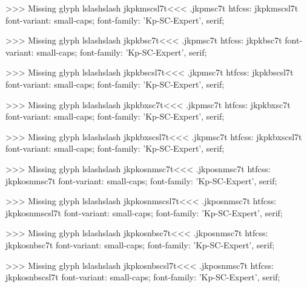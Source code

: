 >>>
Missing glyph	lslashslash
\<jkpkmscsl7t\><<<
.jkpmsc7t
htfcss:  jkpkmscsl7t  font-variant: small-caps; font-family: 'Kp-SC-Expert', serif;

>>>
Missing glyph	lslashslash
\<jkpkbsc7t\><<<
.jkpmsc7t
htfcss:  jkpkbsc7t  font-variant: small-caps; font-family: 'Kp-SC-Expert', serif;

>>>
Missing glyph	lslashslash
\<jkpkbscsl7t\><<<
.jkpmsc7t
htfcss:  jkpkbscsl7t  font-variant: small-caps; font-family: 'Kp-SC-Expert', serif;

>>>
Missing glyph	lslashslash
\<jkpkbxsc7t\><<<
.jkpmsc7t
htfcss:  jkpkbxsc7t  font-variant: small-caps; font-family: 'Kp-SC-Expert', serif;

>>>
Missing glyph	lslashslash
\<jkpkbxscsl7t\><<<
.jkpmsc7t
htfcss:  jkpkbxscsl7t  font-variant: small-caps; font-family: 'Kp-SC-Expert', serif;

>>>
Missing glyph	lslashslash
\<jkpkosnmsc7t\><<<
.jkposnmsc7t
htfcss:  jkpkosnmsc7t  font-variant: small-caps; font-family: 'Kp-SC-Expert', serif;

>>>
Missing glyph	lslashslash
\<jkpkosnmscsl7t\><<<
.jkposnmsc7t
htfcss:  jkpkosnmscsl7t  font-variant: small-caps; font-family: 'Kp-SC-Expert', serif;

>>>
Missing glyph	lslashslash
\<jkpkosnbsc7t\><<<
.jkposnmsc7t
htfcss:  jkpkosnbsc7t  font-variant: small-caps; font-family: 'Kp-SC-Expert', serif;

>>>
Missing glyph	lslashslash
\<jkpkosnbscsl7t\><<<
.jkposnmsc7t
htfcss:  jkpkosnbscsl7t  font-variant: small-caps; font-family: 'Kp-SC-Expert', serif;

